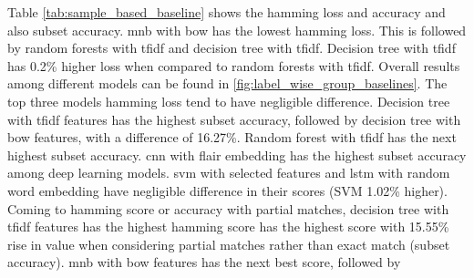 Table \ref{tab:sample_based_baseline} shows the hamming loss and accuracy and also subset accuracy. \acrfull{mnb} with \acrshort{bow} has the lowest hamming loss. This is followed by random forests with \acrshort{tfidf} and decision tree with \acrshort{tfidf}. Decision tree with \acrshort{tfidf} has 0.2\% higher loss when compared to random forests with \acrshort{tfidf}. Overall results among different models can be found in \ref{fig:label_wise_group_baselines}. The top three models hamming loss tend to have negligible difference. Decision tree with \acrshort{tfidf} features has the highest subset accuracy, followed by decision tree with \acrshort{bow} features, with a difference of 16.27\%. Random forest with \acrshort{tfidf} has the next highest subset accuracy. \acrshort{cnn} with flair embedding has the highest subset accuracy among deep learning models. \acrshort{svm} with selected features and \acrshort{lstm} with random word embedding have negligible difference in their scores (SVM 1.02\% higher).  Coming to hamming score or accuracy with partial matches, decision tree with \acrshort{tfidf} features has the highest hamming score has the highest score with 15.55\% rise in value when considering partial matches rather than exact match (subset accuracy). \acrshort{mnb} with \acrshort{bow} features has the next best score, followed by 
\pagebreak
